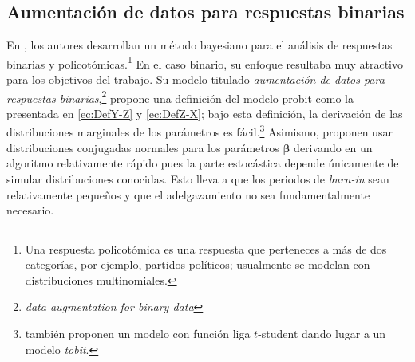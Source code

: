\documentclass[../Main/Main.tex]{subfiles}
\begin{document}
\subsection*{Aumentación de datos para respuestas binarias} \label{sec:AlbertChib}
En \citet{albert1993bayesian}, los autores desarrollan un método bayesiano para el análisis de respuestas binarias y policotómicas.\footnote{Una respuesta policotómica es una respuesta que perteneces a más de dos categorías, por ejemplo, partidos políticos; usualmente se modelan con distribuciones multinomiales.} En el caso binario, su enfoque resultaba muy atractivo para los objetivos del trabajo. Su modelo titulado \textit{aumentación de datos para respuestas binarias},\footnote{\textit{data augmentation for binary data}} propone una definición del modelo probit como la presentada en \eqref{ec:DefY-Z} y \eqref{ec:DefZ-X}; bajo esta definición, la derivación de las distribuciones marginales de los parámetros es fácil.\footnote{\citeauthor{albert1993bayesian} también proponen un modelo con función liga $t$-student dando lugar a un modelo \textit{tobit}.} Asimismo, proponen usar distribuciones conjugadas normales para los parámetros $\bm{\beta}$ derivando en un algoritmo relativamente rápido pues la parte estocástica depende únicamente de simular distribuciones conocidas. Esto lleva a que los periodos de \textit{burn-in} sean relativamente pequeños y que el adelgazamiento no sea fundamentalmente necesario.
\end{document}
